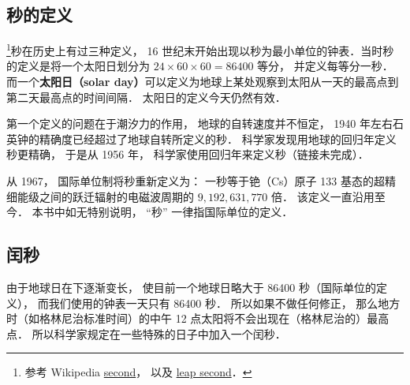 
\subsection{秒的定义}
\footnote{参考 Wikipedia \href{https://en.wikipedia.org/wiki/Second}{second}， 以及 \href{https://en.wikipedia.org/wiki/Leap_second}{leap second}．}秒在历史上有过三种定义， 16 世纪末开始出现以秒为最小单位的钟表．当时秒的定义是将一个太阳日划分为 $24\times60\times60 = 86400$ 等分， 并定义每等分一秒． 而一个\textbf{太阳日（solar day）}可以定义为地球上某处观察到太阳从一天的最高点到第二天最高点的时间间隔． 太阳日的定义今天仍然有效．

第一个定义的问题在于潮汐力的作用， 地球的自转速度并不恒定， 1940 年左右石英钟的精确度已经超过了地球自转所定义的秒． 科学家发现用地球的回归年定义秒更精确， 于是从 1956 年， 科学家使用回归年来定义秒（链接未完成）．

从 1967， 国际单位制将秒重新定义为： 一秒等于铯（Cs）原子 133 基态的超精细能级之间的跃迁辐射的电磁波周期的 $9,192,631,770$ 倍． 该定义一直沿用至今． 本书中如无特别说明， “秒” 一律指国际单位的定义．

\subsection{闰秒}
由于地球日在下逐渐变长， 使目前一个地球日略大于 86400 秒（国际单位的定义）， 而我们使用的钟表一天只有 86400 秒． 所以如果不做任何修正， 那么地方时（如格林尼治标准时间）的中午 12 点太阳将不会出现在（格林尼治的）最高点． 所以科学家规定在一些特殊的日子中加入一个闰秒． 
